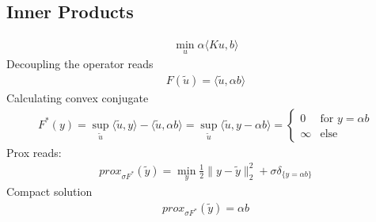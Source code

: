 \documentclass[final,leqno,onefignum,onetabnum]{article}
\newcommand{\1}[1]{\mathds{1}_{#1}}
\begin{document}
\begin{appendix}
\subsection{Inner Products}
\begin{align}
	\min_u \alpha\langle Ku,b\rangle
\end{align}
Decoupling the operator reads
\begin{align}
	F(\tilde{u}) = \langle\tilde{u},\alpha b\rangle
\end{align}
Calculating convex conjugate
\begin{align}
	F^*(y) = \sup_{\tilde{u}} \langle\tilde{u},y\rangle -\langle\tilde{u},\alpha b\rangle = \sup_{\tilde{u}} \langle\tilde{u},y - \alpha b\rangle = \begin{cases}0&\text{for } y=\alpha b\\\infty&\text{else}\end{cases}
\end{align}
Prox reads:
\begin{align}
prox_{\sigma F^*}(\tilde{y}) = \min_y \frac{1}{2}\|y-\tilde{y}\|_2^2 +\sigma \delta_{\{ y = \alpha b \}}
\end{align}
Compact solution
\begin{align}
prox_{\sigma F^*}(\tilde{y}) = \alpha b
\end{align}


\end{appendix}
	
\listoftodos

%
%
	
\end{document}
